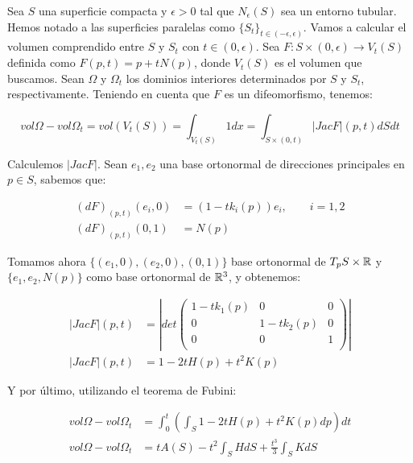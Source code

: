 \begin{remark}
Sea $S$ una superficie compacta y $\epsilon > 0$ tal que $N_\epsilon(S)$ sea un entorno tubular. Hemos notado a las superficies paralelas como $\{S_t\}_{t \in (-\epsilon, \epsilon)}$. Vamos a calcular el volumen comprendido entre $S$ y $S_t$ con $t\in (0, \epsilon)$. Sea $F: S \times (0, \epsilon) \longrightarrow V_t(S)$ definida como $F(p, t) = p + tN(p)$, donde $V_t(S)$ es el volumen que buscamos. Sean $\Omega$ y $\Omega_t$ los dominios interiores determinados por $S$ y $S_t$, respectivamente. Teniendo en cuenta que $F$ es un difeomorfismo, tenemos:

\begin{equation*}
    vol \Omega - vol \Omega_t = vol (V_t(S)) = \int_{V_t(S)} 1dx = \int_{S \times (0,t)} |JacF|(p,t)dSdt
\end{equation*}

Calculemos $|Jac F|$. Sean ${e_1, e_2}$ una base ortonormal de direcciones principales en $p \in S$, sabemos que:

\begin{align*}
    (dF)_{(p,t)}(e_i,0) &= (1-tk_i(p))e_i, \qquad i = 1,2 \\
    (dF)_{(p,t)}(0,1) &= N(p)
\end{align*}

Tomamos ahora $\{(e_1,0), (e_2,0), (0,1)\}$ base ortonormal de $T_pS \times \mathbb{R}$ y $\{e_1, e_2, N(p)\}$ como base ortonormal de $\mathbb{R}^3$, y obtenemos:

\begin{align*}
    |Jac F|(p,t) &= \left|
  det \left( {\begin{array}{ccc}
   1 - tk_1(p) & 0 & 0 \\
   0 & 1-tk_2(p) & 0 \\
   0 & 0 & 1 \\
  \end{array} } \right) \right| \\
  |Jac F|(p,t) &= 1 - 2tH(p) + t^2K(p)
\end{align*}

Y por último, utilizando el teorema de Fubini:

\begin{align*}
    vol \Omega - vol \Omega_t &= \int_0^t \left( \int_{S} 1-2tH(p)+t^2K(p) dp \right) dt \\
    vol \Omega - vol \Omega_t &= tA(S) - t^2\int_S HdS + \frac{t^3}{3}\int_S KdS
\end{align*}
\end{remark}

